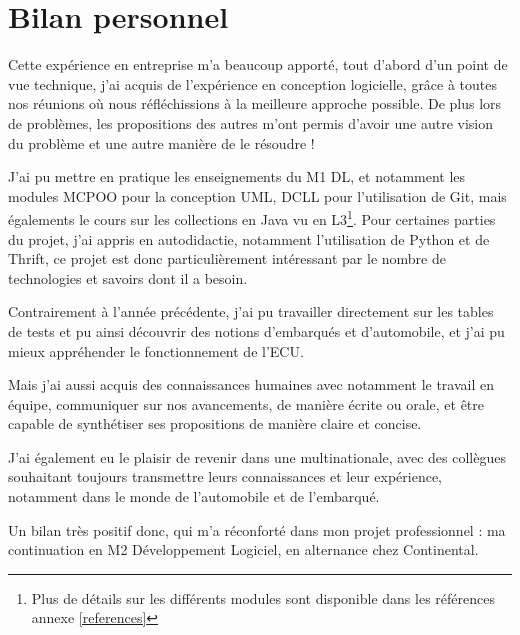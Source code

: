 \newpage
\section{Bilan personnel}
Cette expérience en entreprise m'a beaucoup apporté, tout d'abord d'un point de vue technique, j'ai acquis de l'expérience en conception logicielle, grâce
à toutes nos réunions où nous réfléchissions à la meilleure approche possible. De plus lors de problèmes, les propositions des autres m'ont permis d'avoir
une autre vision du problème et une autre manière de le résoudre !

J'ai pu mettre en pratique les enseignements du M1 DL, et notamment les modules MCPOO pour la conception UML, DCLL pour l'utilisation de Git, mais égalements le cours sur les collections en Java vu en L3\footnote{Plus de détails sur les différents modules sont disponible dans les références annexe \ref{references}}. Pour certaines parties du projet, j'ai appris en autodidactie, notamment l'utilisation de Python et de Thrift, ce projet est donc particulièrement intéressant par le nombre de technologies et savoirs dont il a besoin. 

Contrairement à l'année précédente, j'ai pu travailler directement sur les tables de tests et pu ainsi découvrir des notions d'embarqués et d'automobile, et j'ai pu mieux appréhender le fonctionnement de l'ECU. 

Mais j'ai aussi acquis des connaissances humaines avec notamment le travail en équipe, communiquer sur nos avancements, de manière écrite ou orale, et être capable de synthétiser ses
propositions de manière claire et concise.

J'ai également eu le plaisir de revenir dans une multinationale, avec des collègues souhaitant toujours transmettre leurs connaissances et leur expérience, notamment dans le monde de l'automobile et de l'embarqué. 

Un bilan très positif donc, qui m'a réconforté dans mon projet professionnel : ma continuation en M2 Développement Logiciel, en alternance chez Continental.
